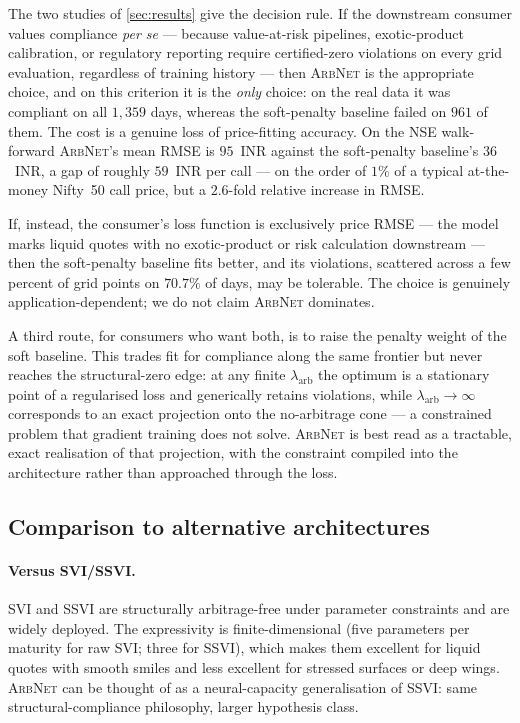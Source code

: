 \documentclass[largeformat]{interact}
\let\cite\citep   %
\theoremstyle{plain}
\theoremstyle{definition}
\newcommand{\arbnet}{\textsc{ArbNet}}
\begin{document}
The two studies of \cref{sec:results} give the decision rule. If the downstream consumer values compliance \emph{per se} --- because value-at-risk pipelines, exotic-product calibration, or regulatory reporting require certified-zero violations on every grid evaluation, regardless of training history --- then \arbnet{} is the appropriate choice, and on this criterion it is the \emph{only} choice: on the real data it was compliant on all $1{,}359$ days, whereas the soft-penalty baseline failed on $961$ of them. The cost is a genuine loss of price-fitting accuracy. On the NSE walk-forward \arbnet{}'s mean RMSE is $95$~INR against the soft-penalty baseline's $36$~INR, a gap of roughly $59$~INR per call --- on the order of $1\%$ of a typical at-the-money Nifty~50 call price, but a $2.6$-fold relative increase in RMSE.

If, instead, the consumer's loss function is exclusively price RMSE --- the model marks liquid quotes with no exotic-product or risk calculation downstream --- then the soft-penalty baseline fits better, and its violations, scattered across a few percent of grid points on $70.7\%$ of days, may be tolerable. The choice is genuinely application-dependent; we do not claim \arbnet{} dominates.

A third route, for consumers who want both, is to raise the penalty weight of the soft baseline. This trades fit for compliance along the same frontier but never reaches the structural-zero edge: at any finite $\lambda_{\mathrm{arb}}$ the optimum is a stationary point of a regularised loss and generically retains violations, while $\lambda_{\mathrm{arb}} \to \infty$ corresponds to an exact projection onto the no-arbitrage cone --- a constrained problem that gradient training does not solve. \arbnet{} is best read as a tractable, exact realisation of that projection, with the constraint compiled into the architecture rather than approached through the loss.

\subsection{Comparison to alternative architectures}
\label{sec:comparison}

\paragraph{Versus SVI/SSVI.}
SVI \cite{gatheral2004parsimonious} and SSVI \cite{gatheral2014arbitrage} are structurally arbitrage-free under parameter constraints and are widely deployed. The expressivity is finite-dimensional (five parameters per maturity for raw SVI; three for SSVI), which makes them excellent for liquid quotes with smooth smiles and less excellent for stressed surfaces or deep wings. \arbnet{} can be thought of as a neural-capacity generalisation of SSVI: same structural-compliance philosophy, larger hypothesis class.
\end{document}
